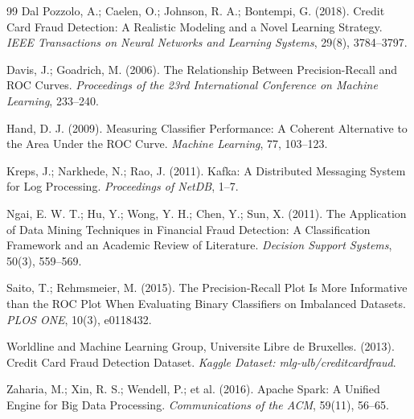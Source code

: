 \documentclass[10pt,twocolumn]{article}
\begin{document}
\begin{thebibliography}{99}
Dal Pozzolo, A.; Caelen, O.; Johnson, R. A.; Bontempi, G. (2018). Credit Card Fraud Detection: A Realistic Modeling and a Novel Learning Strategy. \textit{IEEE Transactions on Neural Networks and Learning Systems}, 29(8), 3784--3797.

Davis, J.; Goadrich, M. (2006). The Relationship Between Precision-Recall and ROC Curves. \textit{Proceedings of the 23rd International Conference on Machine Learning}, 233--240.

Hand, D. J. (2009). Measuring Classifier Performance: A Coherent Alternative to the Area Under the ROC Curve. \textit{Machine Learning}, 77, 103--123.

Kreps, J.; Narkhede, N.; Rao, J. (2011). Kafka: A Distributed Messaging System for Log Processing. \textit{Proceedings of NetDB}, 1--7.

Ngai, E. W. T.; Hu, Y.; Wong, Y. H.; Chen, Y.; Sun, X. (2011). The Application of Data Mining Techniques in Financial Fraud Detection: A Classification Framework and an Academic Review of Literature. \textit{Decision Support Systems}, 50(3), 559--569.

Saito, T.; Rehmsmeier, M. (2015). The Precision-Recall Plot Is More Informative than the ROC Plot When Evaluating Binary Classifiers on Imbalanced Datasets. \textit{PLOS ONE}, 10(3), e0118432.

Worldline and Machine Learning Group, Universite Libre de Bruxelles. (2013). Credit Card Fraud Detection Dataset. \textit{Kaggle Dataset: mlg-ulb/creditcardfraud}.

Zaharia, M.; Xin, R. S.; Wendell, P.; et al. (2016). Apache Spark: A Unified Engine for Big Data Processing. \textit{Communications of the ACM}, 59(11), 56--65.

\end{thebibliography}
\end{document}
